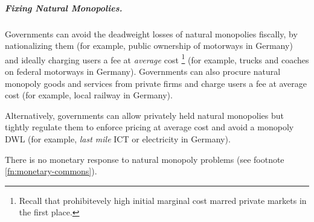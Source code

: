 \subparagraph{Fixing Natural Monopolies.}  \label{sec:natural-monopoly-response} 
Governments can avoid the deadweight losses of natural monopolies fiscally, by nationalizing them (for example, public ownership of motorways in Germany) and ideally charging users a fee at \emph{average} cost
\footnote{\label{fn:why-ac-fees}
	Recall that prohibitevely high initial marginal cost marred private markets in the first place.
} 
(for example, trucks and coaches on federal motorways in Germany). 
Governments can also procure natural monopoly goods and services from private firms and charge users a fee at average cost (for example, local railway in Germany).

		
Alternatively, governments can allow privately held natural monopolies but tightly regulate them to enforce pricing at average cost and avoid a monopoly \gls{DWL} (for example, \emph{last mile} \gls{ICT} or electricity in Germany).

There is no monetary response to natural monopoly problems (see footnote \ref{fn:monetary-commons}).




